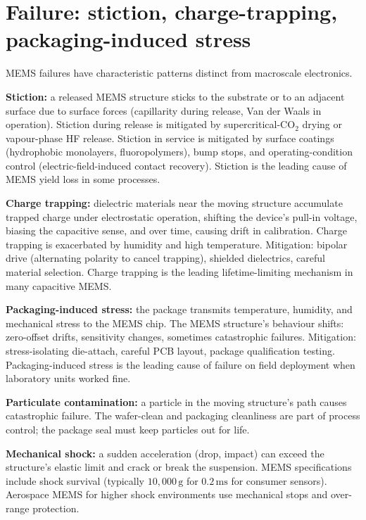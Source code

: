 \section{Failure: stiction, charge-trapping, packaging-induced stress}

MEMS failures have characteristic patterns distinct from macroscale electronics.

\textbf{Stiction:} a released MEMS structure sticks to the substrate or to an adjacent surface due to surface forces (capillarity during release, Van der Waals in operation). Stiction during release is mitigated by supercritical-CO$_2$ drying or vapour-phase HF release. Stiction in service is mitigated by surface coatings (hydrophobic monolayers, fluoropolymers), bump stops, and operating-condition control (electric-field-induced contact recovery). Stiction is the leading cause of MEMS yield loss in some processes.

\textbf{Charge trapping:} dielectric materials near the moving structure accumulate trapped charge under electrostatic operation, shifting the device's pull-in voltage, biasing the capacitive sense, and over time, causing drift in calibration. Charge trapping is exacerbated by humidity and high temperature. Mitigation: bipolar drive (alternating polarity to cancel trapping), shielded dielectrics, careful material selection. Charge trapping is the leading lifetime-limiting mechanism in many capacitive MEMS.

\textbf{Packaging-induced stress:} the package transmits temperature, humidity, and mechanical stress to the MEMS chip. The MEMS structure's behaviour shifts: zero-offset drifts, sensitivity changes, sometimes catastrophic failures. Mitigation: stress-isolating die-attach, careful PCB layout, package qualification testing. Packaging-induced stress is the leading cause of failure on field deployment when laboratory units worked fine.

\textbf{Particulate contamination:} a particle in the moving structure's path causes catastrophic failure. The wafer-clean and packaging cleanliness are part of process control; the package seal must keep particles out for life.

\textbf{Mechanical shock:} a sudden acceleration (drop, impact) can exceed the structure's elastic limit and crack or break the suspension. MEMS specifications include shock survival (typically $10{,}000\,\text{g}$ for $0.2\,\text{ms}$ for consumer sensors). Aerospace MEMS for higher shock environments use mechanical stops and over-range protection.

